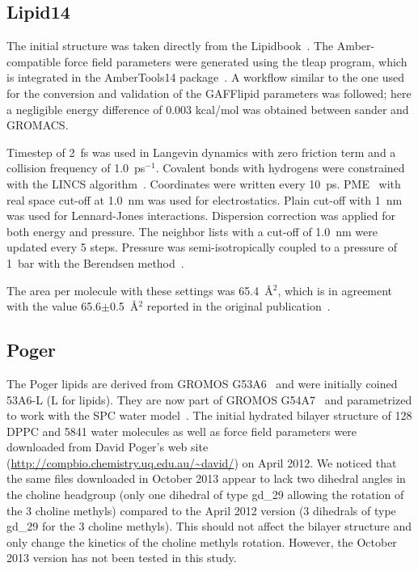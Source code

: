 \documentclass[journal=jacsat,manuscript=article]{achemso}
\begin{document}
\subsection{Lipid14}
The initial structure was taken directly from the Lipidbook~\cite{domanski10}.
The Amber-compatible force field parameters were generated using the tleap program, which is integrated in the AmberTools14 package~\cite{ferrer13}. 
A workflow similar to the one used for the conversion and validation of the GAFFlipid parameters was followed;
here a negligible energy difference of 0.003 kcal/mol was obtained between sander and GROMACS.

Timestep of 2~fs was used in Langevin dynamics with zero friction term and a collision frequency of 1.0~ps$^{-1}$. 
Covalent bonds with hydrogens were constrained with the LINCS algorithm~\cite{hess97,hess07}.
Coordinates were written every 10~ps. PME~\cite{darden93,essman95} with real space cut-off at 1.0~nm was used 
for electrostatics. Plain cut-off with 1~nm was used for Lennard-Jones interactions. Dispersion correction
was applied for both energy and pressure. The neighbor lists with a cut-off of 1.0~nm were updated every 5 steps. 
Pressure was semi-isotropically coupled to a pressure of 1~bar with the Berendsen method~\cite{berendsen84}.

The area per molecule with these settings was 65.4~\AA$^2$, which is in agreement with the value 65.6$\pm$0.5~\AA$^2$ reported in the original publication~\cite{dickson14}.

\subsection{Poger}
The Poger lipids are derived from GROMOS G53A6~\cite{poger10} and were initially coined 53A6-L (L for lipids). They are now part of GROMOS G54A7~\cite{poger12} 
and parametrized to work with the SPC water model~\cite{berendsen81}. The initial hydrated bilayer structure of 128 DPPC and 5841 water molecules as well as force field parameters were downloaded 
from David Poger's web site (\url{http://compbio.chemistry.uq.edu.au/~david/}) on April 2012. 
We noticed that the same files downloaded in October 2013 appear to lack two dihedral angles in the choline headgroup (only one dihedral of type gd\_29 allowing 
the rotation of the 3 choline methyls) compared to the April 2012 version (3 dihedrals of type gd\_29 for the 3 choline methyls). This should not affect the 
bilayer structure and only change the kinetics of the choline methyls rotation. However, the October 2013 version has not been tested in this study.
\end{document}
